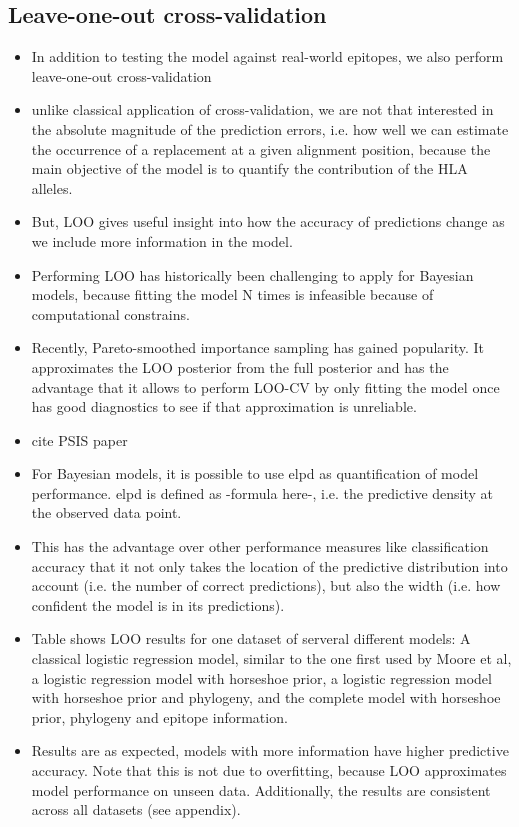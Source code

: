 \documentclass[fleqn,11pt]{SelfArx} %
\begin{document}
\subsection{Leave-one-out cross-validation}

\begin{itemize}
  \item In addition to testing the model against real-world epitopes, we also perform leave-one-out cross-validation
  \item unlike classical application of cross-validation, we are not that interested in the absolute magnitude of the prediction errors, i.e. how well we can estimate the occurrence of a replacement at a given alignment position, because the main objective of the model is to quantify the contribution of the HLA alleles.
  \item But, LOO gives useful insight into how the accuracy of predictions change as we include more information in the model. 
  \item Performing LOO has historically been challenging to apply for Bayesian models, because fitting the model N times is infeasible because of computational constrains.
  \item Recently, Pareto-smoothed importance sampling has gained popularity. It approximates the LOO posterior from the full posterior and has the advantage that it allows to perform LOO-CV by only fitting the model once has good diagnostics to see if that approximation is unreliable.
  \item cite PSIS paper
  \item For Bayesian models, it is possible to use elpd as quantification of model performance. elpd is defined as -formula here-, i.e. the predictive density at the observed data point.
  \item This has the advantage over other performance measures like classification accuracy that it not only takes the location of the predictive distribution into account (i.e. the number of correct predictions), but also the width (i.e. how confident the model is in its predictions).
  \item Table shows LOO results for one dataset of serveral different models: A classical logistic regression model, similar to the one first used by Moore et al, a logistic regression model with horseshoe prior, a logistic regression model with horseshoe prior and phylogeny, and the complete model with horseshoe prior, phylogeny and epitope information. 
  \item Results are as expected, models with more information have higher predictive accuracy. Note that this is not due to overfitting, because LOO approximates model performance on unseen data. Additionally, the results are consistent across all datasets (see appendix).

\end{itemize}
\end{document}

